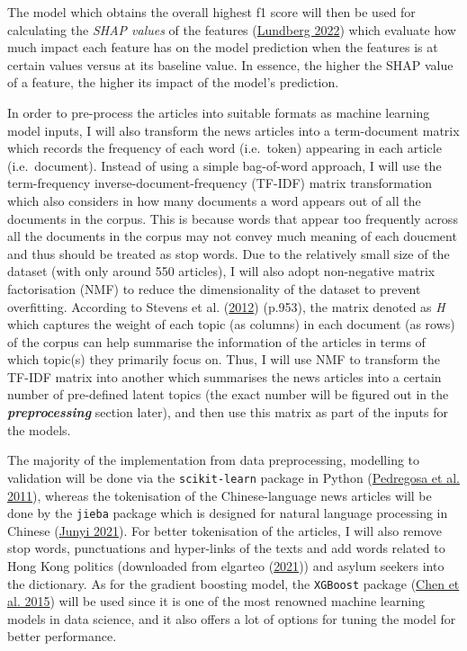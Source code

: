 \documentclass[a4paper, oneside]{report}
\begin{document}
The model which obtains the overall highest f1 score will then be used
for calculating the \emph{SHAP values} of the features
(\protect\hyperlink{ref-lundbergSlundbergShap2022}{Lundberg 2022}) which
evaluate how much impact each feature has on the model prediction when
the features is at certain values versus at its baseline value. In
essence, the higher the SHAP value of a feature, the higher its impact
of the model's prediction.

In order to pre-process the articles into suitable formats as machine
learning model inputs, I will also transform the news articles into a
term-document matrix which records the frequency of each word
(i.e.~token) appearing in each article (i.e.~document). Instead of using
a simple bag-of-word approach, I will use the term-frequency
inverse-document-frequency (TF-IDF) matrix transformation which also
considers in how many documents a word appears out of all the documents
in the corpus. This is because words that appear too frequently across
all the documents in the corpus may not convey much meaning of each
doucment and thus should be treated as stop words. Due to the relatively
small size of the dataset (with only around 550 articles), I will also
adopt non-negative matrix factorisation (NMF) to reduce the
dimensionality of the dataset to prevent overfitting. According to
Stevens et al.
(\protect\hyperlink{ref-stevensExploringTopicCoherence2012}{2012})
(p.953), the matrix denoted as \emph{H} which captures the weight of
each topic (as columns) in each document (as rows) of the corpus can
help summarise the information of the articles in terms of which
topic(s) they primarily focus on. Thus, I will use NMF to transform the
TF-IDF matrix into another which summarises the news articles into a
certain number of pre-defined latent topics (the exact number will be
figured out in the \textbf{\emph{preprocessing}} section later), and
then use this matrix as part of the inputs for the models.

The majority of the implementation from data preprocessing, modelling to
validation will be done via the \texttt{scikit-learn} package in Python
(\protect\hyperlink{ref-pedregosaScikitlearnMachineLearning2011}{Pedregosa
et al. 2011}), whereas the tokenisation of the Chinese-language news
articles will be done by the \texttt{jieba} package which is designed
for natural language processing in Chinese
(\protect\hyperlink{ref-junyiJieba2021}{Junyi 2021}). For better
tokenisation of the articles, I will also remove stop words,
punctuations and hyper-links of the texts and add words related to Hong
Kong politics (downloaded from elgarteo
(\protect\hyperlink{ref-elgarteoHKPolDictHongKong2021}{2021})) and
asylum seekers into the dictionary. As for the gradient boosting model,
the \texttt{XGBoost} package
(\protect\hyperlink{ref-chenXgboostExtremeGradient2015}{Chen et al.
2015}) will be used since it is one of the most renowned machine
learning models in data science, and it also offers a lot of options for
tuning the model for better performance.
\end{document}
